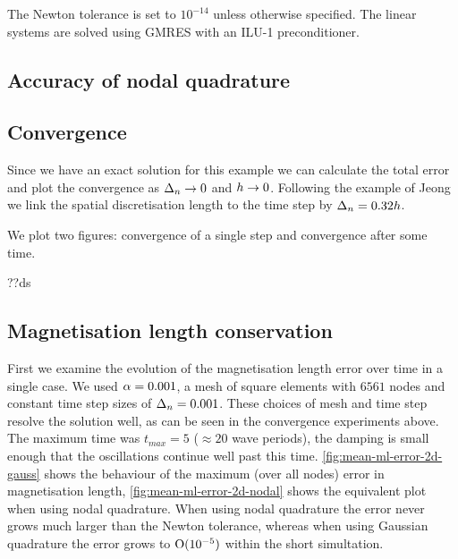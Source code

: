 The Newton tolerance is set to $10^{-14}$ unless otherwise specified.
The linear systems are solved using GMRES with an ILU-1 preconditioner.


\subsection{Accuracy of nodal quadrature}



\subsection{Convergence}

Since we have an exact solution for this example we can calculate the total error and plot the convergence as $\Delta_{n} \rightarrow 0$ and $h \rightarrow 0$.
Following the example of Jeong \etal\cite{Jeong2014} we link the spatial discretisation length to the time step by $\Delta_{n} = 0.32h$.

We plot two figures: convergence of a single step and convergence after some time.

??ds


\subsection{Magnetisation length conservation}

First we examine the evolution of the magnetisation length error over time in a single case.
We used $\alpha = 0.001$, a mesh of square elements with $6561$ nodes and constant time step sizes of $\Delta_{n} = 0.001$. 
These choices of mesh and time step resolve the solution well, as can be seen in the convergence experiments above.
The maximum time was $t_{max} = 5$ ($\approx 20$ wave periods), the damping is small enough that the oscillations continue well past this time. %
\autoref{fig:mean-ml-error-2d-gauss} shows the behaviour of the maximum (over all nodes) error in magnetisation length, \autoref{fig:mean-ml-error-2d-nodal} shows the equivalent plot when using nodal quadrature.
When using nodal quadrature the error never grows much larger than the Newton tolerance, whereas when using Gaussian quadrature the error grows to $\text{O}(10^{-5})$ within the short simultation.

